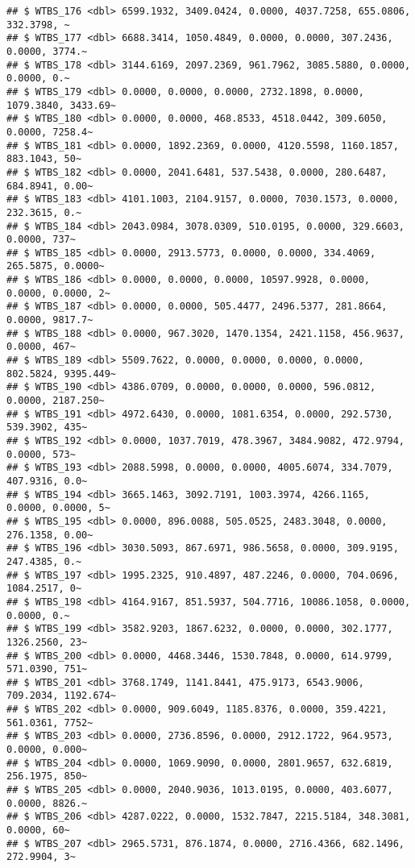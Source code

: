 \documentclass[
]{article}
\begin{document}
\begin{verbatim}
## $ WTBS_176 <dbl> 6599.1932, 3409.0424, 0.0000, 4037.7258, 655.0806, 332.3798, ~
## $ WTBS_177 <dbl> 6688.3414, 1050.4849, 0.0000, 0.0000, 307.2436, 0.0000, 3774.~
## $ WTBS_178 <dbl> 3144.6169, 2097.2369, 961.7962, 3085.5880, 0.0000, 0.0000, 0.~
## $ WTBS_179 <dbl> 0.0000, 0.0000, 0.0000, 2732.1898, 0.0000, 1079.3840, 3433.69~
## $ WTBS_180 <dbl> 0.0000, 0.0000, 468.8533, 4518.0442, 309.6050, 0.0000, 7258.4~
## $ WTBS_181 <dbl> 0.0000, 1892.2369, 0.0000, 4120.5598, 1160.1857, 883.1043, 50~
## $ WTBS_182 <dbl> 0.0000, 2041.6481, 537.5438, 0.0000, 280.6487, 684.8941, 0.00~
## $ WTBS_183 <dbl> 4101.1003, 2104.9157, 0.0000, 7030.1573, 0.0000, 232.3615, 0.~
## $ WTBS_184 <dbl> 2043.0984, 3078.0309, 510.0195, 0.0000, 329.6603, 0.0000, 737~
## $ WTBS_185 <dbl> 0.0000, 2913.5773, 0.0000, 0.0000, 334.4069, 265.5875, 0.0000~
## $ WTBS_186 <dbl> 0.0000, 0.0000, 0.0000, 10597.9928, 0.0000, 0.0000, 0.0000, 2~
## $ WTBS_187 <dbl> 0.0000, 0.0000, 505.4477, 2496.5377, 281.8664, 0.0000, 9817.7~
## $ WTBS_188 <dbl> 0.0000, 967.3020, 1470.1354, 2421.1158, 456.9637, 0.0000, 467~
## $ WTBS_189 <dbl> 5509.7622, 0.0000, 0.0000, 0.0000, 0.0000, 802.5824, 9395.449~
## $ WTBS_190 <dbl> 4386.0709, 0.0000, 0.0000, 0.0000, 596.0812, 0.0000, 2187.250~
## $ WTBS_191 <dbl> 4972.6430, 0.0000, 1081.6354, 0.0000, 292.5730, 539.3902, 435~
## $ WTBS_192 <dbl> 0.0000, 1037.7019, 478.3967, 3484.9082, 472.9794, 0.0000, 573~
## $ WTBS_193 <dbl> 2088.5998, 0.0000, 0.0000, 4005.6074, 334.7079, 407.9316, 0.0~
## $ WTBS_194 <dbl> 3665.1463, 3092.7191, 1003.3974, 4266.1165, 0.0000, 0.0000, 5~
## $ WTBS_195 <dbl> 0.0000, 896.0088, 505.0525, 2483.3048, 0.0000, 276.1358, 0.00~
## $ WTBS_196 <dbl> 3030.5093, 867.6971, 986.5658, 0.0000, 309.9195, 247.4385, 0.~
## $ WTBS_197 <dbl> 1995.2325, 910.4897, 487.2246, 0.0000, 704.0696, 1084.2517, 0~
## $ WTBS_198 <dbl> 4164.9167, 851.5937, 504.7716, 10086.1058, 0.0000, 0.0000, 0.~
## $ WTBS_199 <dbl> 3582.9203, 1867.6232, 0.0000, 0.0000, 302.1777, 1326.2560, 23~
## $ WTBS_200 <dbl> 0.0000, 4468.3446, 1530.7848, 0.0000, 614.9799, 571.0390, 751~
## $ WTBS_201 <dbl> 3768.1749, 1141.8441, 475.9173, 6543.9006, 709.2034, 1192.674~
## $ WTBS_202 <dbl> 0.0000, 909.6049, 1185.8376, 0.0000, 359.4221, 561.0361, 7752~
## $ WTBS_203 <dbl> 0.0000, 2736.8596, 0.0000, 2912.1722, 964.9573, 0.0000, 0.000~
## $ WTBS_204 <dbl> 0.0000, 1069.9090, 0.0000, 2801.9657, 632.6819, 256.1975, 850~
## $ WTBS_205 <dbl> 0.0000, 2040.9036, 1013.0195, 0.0000, 403.6077, 0.0000, 8826.~
## $ WTBS_206 <dbl> 4287.0222, 0.0000, 1532.7847, 2215.5184, 348.3081, 0.0000, 60~
## $ WTBS_207 <dbl> 2965.5731, 876.1874, 0.0000, 2716.4366, 682.1496, 272.9904, 3~

\end{verbatim}
\end{document}
